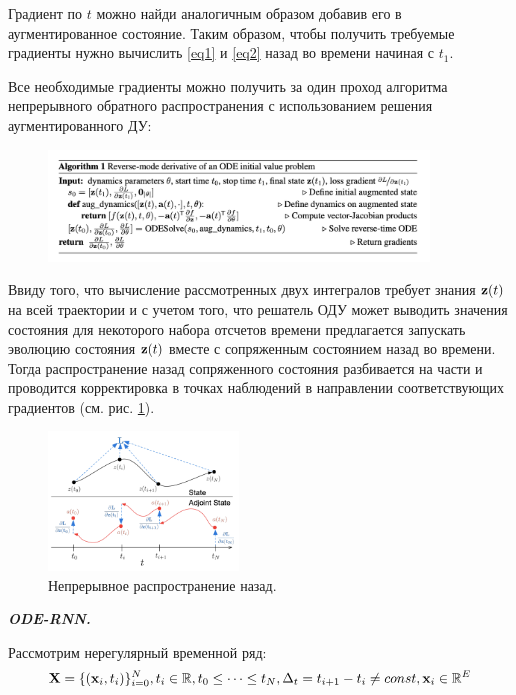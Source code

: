 Градиент по $t$ можно найди аналогичным образом добавив его в аугментированное состояние. Таким образом, чтобы получить требуемые градиенты нужно вычислить \ref{eq1} и \ref{eq2} назад во времени начиная с $t_1$.

Все необходимые градиенты можно получить за один проход алгоритма непрерывного обратного распространения с использованием решения аугментированного ДУ:

\begin{figure}[!h]
	\centering
	\includegraphics[width=0.9\textwidth]{chapters/varenik1/backpropagation-algo.png}
\end{figure}

Ввиду того, что вычисление рассмотренных двух интегралов требует знания $\textbf{z}(t)$ на всей траектории и с учетом того, что решатель ОДУ может выводить значения состояния для некоторого набора отсчетов времени предлагается запускать эволюцию состояния $\textbf{z}(t)$ вместе с сопряженным состоянием назад во времени. Тогда распространение назад сопряженного состояния разбивается на части и проводится корректировка в точках наблюдений в направлении соответствующих градиентов (см. рис. \ref{fig:im1}).

\begin{figure}[!h]
	\centering
	\includegraphics[width=0.45\textwidth]{chapters/varenik1/backpropagation.png}
	\caption{Непрерывное распространение назад.}
	\label{fig:im1}
\end{figure}

\newpage
\textit{\textbf{ODE-RNN.}}

Рассмотрим нерегулярный временной ряд:
\begin{equation*}
    \textbf{X} = \{(\textbf{x}_i, t_i)\}_{i=0}^N, t_i\in \mathbb{R}, t_0 \le \dots \le t_N, \Delta_t = t_{i+1} - t_{i} \neq const, \textbf{x}_i \in \mathbb{R}^E
\end{equation*}

